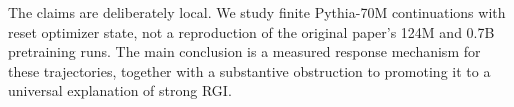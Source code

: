 The claims are deliberately local.  We study finite Pythia-70M continuations with reset optimizer state, not a reproduction of the original paper's 124M and 0.7B pretraining runs.  The main conclusion is a measured response mechanism for these trajectories, together with a substantive obstruction to promoting it to a universal explanation of strong RGI.
